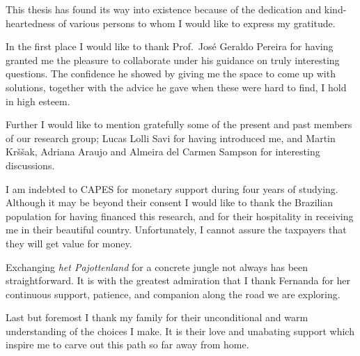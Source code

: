 \documentclass[
final,
11pt,
a4paper,
DIV=11,
headinclude=true,
footinclude=false,
bibliography=totoc,
twoside=true,  %
BCOR=5mm
]{scrbook}
\begin{document}
\frontmatter



\cleardoubleemptypage


\thispagestyle{plain}


\cleardoubleemptypage

\thispagestyle{plain}



\tableofcontents

\thispagestyle{empty}

This thesis has found its way into existence because of the 
dedication and kind-heartedness of various persons to whom 
I would like to express my gratitude.

In the first place I would like to thank Prof.~José Geraldo 
Pereira for having granted me the pleasure to collaborate under 
his guidance on truly interesting questions. The confidence he 
showed by giving me the space to come up with solutions, together 
with the advice he gave when these were hard to find, I hold in 
high esteem.

Further I would like to mention gratefully some of the present 
and past members of our research group; Lucas Lolli Savi for 
having introduced me, and Martin Kr\v{s}\v{s}ak, Adriana Araujo 
and Almeira del Carmen Sampson for interesting discussions.

I am indebted to CAPES for monetary support during four years of 
studying. Although it may be beyond their consent I would like to 
thank the Brazilian population for having financed this research, 
and for their hospitality in receiving me in their beautiful 
country. Unfortunately, I cannot assure the taxpayers that they 
will get value for money.

Exchanging \emph{het Pajottenland} for a concrete jungle not 
always has been straightforward. It is with the greatest 
admiration that I thank Fernanda for her continuous support, 
patience, and companion along the road we are exploring.

Last but foremost I thank my family for their unconditional and 
warm understanding of the choices I make. It is their love and 
unabating support which inspire me to carve out this path so far 
away from home.

\cleardoubleemptypage
\thispagestyle{empty}

\vspace*{2cm}
\end{document}
